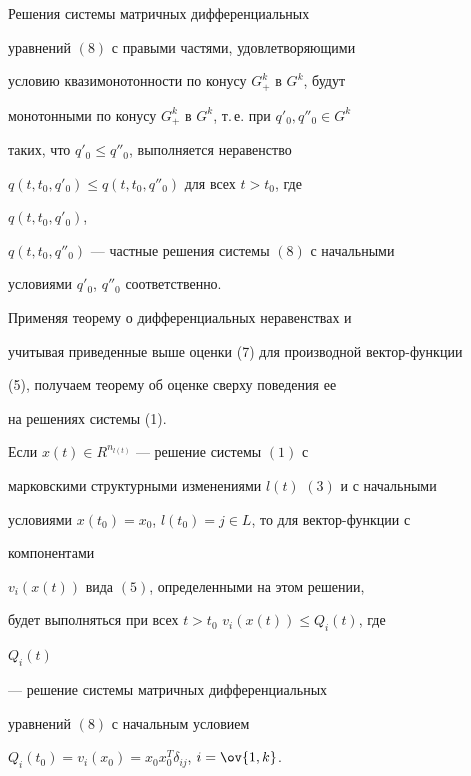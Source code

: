 \begin{lem} 


Решения системы матричных дифференциальных 


уравнений $(8)$ с правыми частями, удовлетворяющими  


условию квазимонотонности по конусу $G^k_+$ в $G^k$, будут  


монотонными по конусу $G^k_+$ в $G^k$, т.\,е. при $q'_0,q''_0\in G^k$ 


таких, что $q'_0\le q''_0$, выполняется неравенство  


$q(t,t_0,q'_0)\le q(t,t_0,q''_0)$ для всех $t>t_0$, где 


$q(t,t_0,q'_0)$, 


$q(t,t_0,q''_0)$ --- частные решения системы $(8)$ с начальными  


условиями $q'_0$, $q''_0$ соответственно. 


\end{lem} 


 


Применяя теорему о дифференциальных неравенствах и  


учитывая приведенные выше оценки (7) для производной вектор-функции 


(5), получаем теорему об оценке сверху поведения ее  


на решениях системы (1). 


 


\begin{thm} 


Если $x(t)\in R^{n_{l(t)}}$ --- решение системы $(1)$ с  


марковскими структурными изменениями $l(t)$ $(3)$ и с начальными  


условиями $x(t_0)=x_0$, $l(t_0)=j\in L$, то для вектор-функции с 


компонентами 


$v_i(x(t))$ вида $(5)$, определенными на этом решении,  


будет выполняться при всех $t>t_0$\; $v_i(x(t))\le Q_i(t)$, где 


$Q_i(t)$ 


--- решение системы матричных дифференциальных 


уравнений $(8)$ с начальным условием 


$Q_i(t_0)=v_i(x_0)=x_0x^T_0\delta_{ij}$, $i=\ov{1,k}$. 


\end{thm} 



